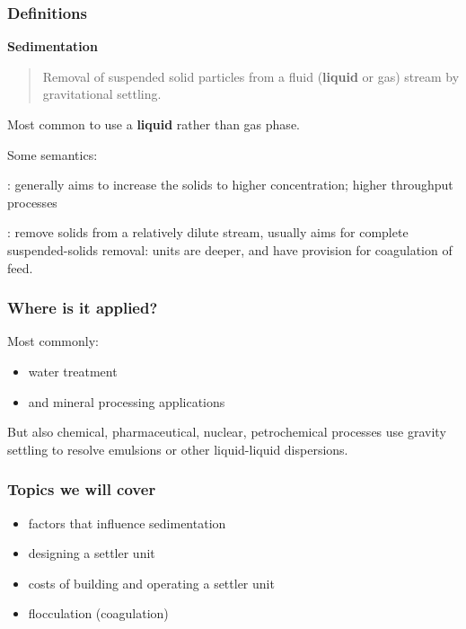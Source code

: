 \begin{frame}\frametitle{Definitions}	
	\textbf{Sedimentation}
	\begin{quote}	
		Removal of suspended solid particles from a fluid (\textbf{liquid} or gas) stream by gravitational settling.
	\end{quote}
	Most common to use a \textbf{liquid} rather than gas phase.

	\vspace{12pt}
	Some semantics:
	
	\vspace{12pt}	
	{\color{myGreen}{Thickening}}: generally aims to increase the solids to higher concentration; higher throughput processes

	\vspace{12pt}
	{\color{myGreen}{Clarification}}: remove solids from a relatively dilute stream, usually aims for complete suspended-solids removal: units are deeper, and have provision for coagulation of feed.
	
\end{frame}

\begin{frame}\frametitle{Where is it applied?}	
	Most commonly:
	\begin{itemize}
		\item	water treatment
		\item	and mineral processing applications
	\end{itemize}
	
	\vspace{12pt}
	But also chemical, pharmaceutical, nuclear, petrochemical processes use gravity settling to resolve emulsions or other liquid-liquid dispersions. 	
\end{frame}

\begin{frame}\frametitle{Topics we will cover}
	\begin{itemize}
		\item	factors that influence sedimentation
		\item	designing a settler unit
		\item	costs of building and operating a settler unit
		\item	flocculation (coagulation)
	\end{itemize}
\end{frame}

